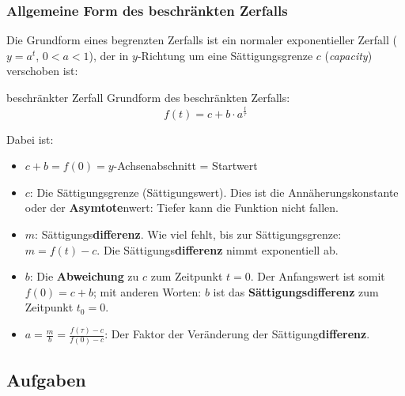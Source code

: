 \newpage

\subsubsection{Allgemeine Form des beschränkten Zerfalls}
\begin{center}
\end{center}

Die Grundform eines begrenzten Zerfalls ist ein normaler
exponentieller Zerfall ($y=a^{t}$, $0<a<1$), der in $y$-Richtung um
eine Sättigungsgrenze $c$
(\textit{capacity}) verschoben ist:

\begin{gesetz}{beschränkter Zerfall}{}
  Grundform des beschränkten Zerfalls:
$$f(t) = c + b\cdot{}a^{\frac{t}{\tau}}$$
\end{gesetz}

Dabei ist:
\begin{itemize}
  \item $c+b = f(0) = y$-Achsenabschnitt = Startwert
	\item $c$: Die Sättigungsgrenze
    (Sättigungswert). Dies ist die Annäherungskonstante oder der
    \textbf{Asymtote}nwert: Tiefer kann die Funktion nicht fallen.

	\item $m$:
    Sättigungs\textbf{differenz}. Wie viel fehlt, bis zur
    Sättigungsgrenze: $m = f(t) - c$. Die Sättigungs\textbf{differenz} nimmt exponentiell ab.
	\item $b$: Die \textbf{Abweichung} zu $c$ zum Zeitpunkt $t=0$. Der
    Anfangswert ist somit $f(0) = c + b$; mit anderen Worten: $b$ ist das
    \textbf{Sättigungsdifferenz} zum Zeitpunkt $t_0 = 0$.

    \item $a=\frac{m}{b}=\frac{f(\tau)-c}{f(0)-c}$: Der Faktor der
      Veränderung der Sättigung\textbf{differenz}.
\end{itemize}
\newpage


\subsection*{Aufgaben}

